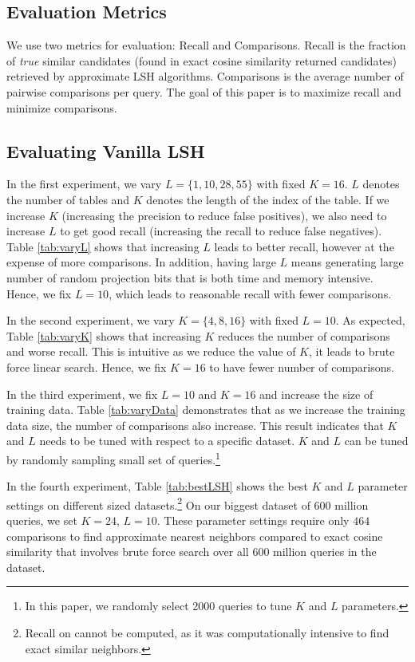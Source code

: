 \subsection{Evaluation Metrics}
We use two metrics for evaluation: Recall and Comparisons. 
Recall is the fraction of \emph{true} similar candidates (found in exact cosine similarity returned candidates) 
retrieved by approximate LSH algorithms.  
Comparisons is the average number of pairwise comparisons per query. 
The goal of this paper is to maximize recall and minimize comparisons.

\subsection{Evaluating Vanilla LSH} 
\label{subsec:eval:vanillaLSH}
In the first experiment, we vary $L=\{1,10,28,55\}$ with fixed $K=16$. 
$L$ denotes the number of tables and $K$ denotes the length of the index of the table. 
If we increase $K$ (increasing the precision to reduce false positives), we also need to 
increase $L$ to get good recall (increasing the recall to reduce false negatives). 
Table \ref{tab:varyL} shows that increasing $L$ leads to better recall, 
however at the expense of more comparisons. In addition, having large $L$ 
means generating large number of random projection bits that is 
both time and memory intensive. Hence, we fix $L=10$, 
which leads to reasonable recall with fewer comparisons. 

In the second experiment, we vary $K=\{4,8,16\}$ with fixed $L=10$. 
As expected, Table \ref{tab:varyK} shows that increasing $K$ reduces the number of 
comparisons and worse recall. This is intuitive as we reduce the value of $K$, it leads to 
brute force linear search. Hence, we fix $K=16$ to have fewer number of comparisons.   

In the third experiment, we fix $L=10$ and $K=16$ and increase the size of training data. 
Table \ref{tab:varyData} demonstrates that as we increase the training data size, 
the number of comparisons also increase. This result indicates that $K$ and $L$  
needs to be tuned with respect to a specific dataset. $K$ and $L$ can be tuned by 
randomly sampling small set of queries.\footnote{In this paper, we randomly select 2000 queries to tune $K$ and $L$ parameters.}

In the fourth experiment, Table \ref{tab:bestLSH} shows the best $K$ and $L$ parameter settings on different 
sized datasets.\footnote{Recall on \dataC cannot be computed, as it was computationally intensive to find exact similar neighbors.} 
On our biggest dataset of 600 million queries, we set $K=24$, $L=10$. These parameter settings require only 
$464$ comparisons to find approximate nearest neighbors compared to exact cosine similarity that involves 
brute force search over all 600 million queries in the dataset.  

